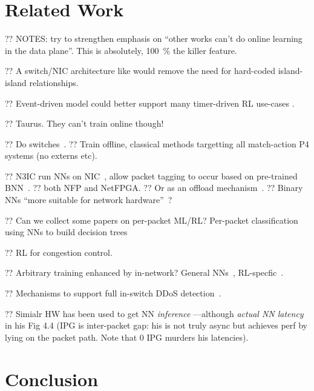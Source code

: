 \documentclass[sigconf,natbib=false]{acmart}
\begin{document}
\section{Related Work}

?? NOTES: try to strengthen emphasis on ``other works can't do online learning in the data plane''. This is absolutely, \SI{100}{\percent} the killer feature.

?? A switch/NIC architecture like \textcite{DBLP:conf/hotnets/StephensAS18} would remove the need for hard-coded island-island relationships.

?? Event-driven model could better support many timer-driven RL use-cases \textcite{DBLP:conf/hotnets/IbanezABM19}.

?? Taurus. They can't train online though!~\parencite{DBLP:journals/corr/abs-2002-08987}

?? Do switches~\parencite{DBLP:conf/hotnets/XiongZ19}.
?? Train offline, classical methods targetting all match-action P4 systems (no externs etc).

?? N3IC run NNs on NIC~\parencite{DBLP:journals/corr/abs-2009-02353}, allow packet tagging to occur based on pre-trained BNN~\parencite{DBLP:conf/nips/HubaraCSEB16}.
?? both NFP and NetFPGA.
?? Or as an offload mechanism~\parencite{DBLP:conf/sigcomm/SanvitoSB18,DBLP:journals/corr/abs-1801-05731}.
?? Binary NNs ``more suitable for network hardware''~\parencite{DBLP:journals/corr/MiyashitaLM16}?

?? Can we collect some papers on per-packet ML/RL? Per-packet classification using NNs to build decision trees~\parencite{DBLP:conf/sigcomm/LiangZJS19}

?? RL for congestion control. ~\parencite{DBLP:journals/corr/abs-1910-04054}

?? Arbitrary training enhanced by in-network? General NNs~\parencite{DBLP:conf/micro/LiPAYQPWSEK18}, RL-specfic~\parencite{DBLP:conf/isca/LiLYCSH19}.

?? Mechanisms to support full in-switch DDoS detection~\cite{tnms-ddos-victim-ident}.

?? Simialr HW has been used to get NN \emph{inference} \textcite{langlet-ml-netronome}---although \emph{actual NN latency} in his Fig 4.4 (IPG is inter-packet gap: his is not truly async but achieves perf by lying on the packet path. Note that 0 IPG murders his latencies).

\section{Conclusion}
\end{document}
